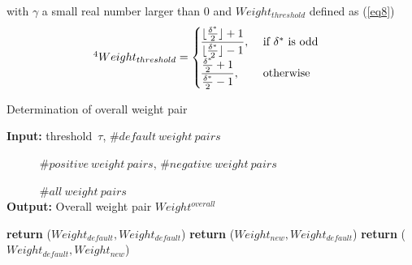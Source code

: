 with $\gamma$ a small real number larger than 0 and $Weight_{threshold}$ defined as (\ref{eq8})
\begin{equation}\label{eq8}\footnotemark[4]
    Weight_{threshold}=\left\{\begin{array}{ll}
        \hspace{-6pt}\dfrac{\lfloor \frac{\delta^{*}}{2}\rfloor +1}{\lfloor \frac{\delta^{*}}{2}\rfloor -1}, & \text { if } \delta^{*} \text { is odd } \\
    \hspace{-6pt}\dfrac{\frac{\delta^{*}}{2}+1}{\frac{\delta^{*}}{2}-1}, & \text { otherwise }
    \end{array}\right.
\end{equation}
\begin{algorithm}[h]
    \caption{Determination of overall weight pair}
    \label{algo3}
    \hspace*{0.02in} {\bf Input:} threshold\ $\tau$, $\#default\ weight\ pairs$\footnotemark[5]

    $\hspace{35pt} \#positive\ weight\ pairs$\footnotemark[6], $\#negative\ weight\ pairs$\footnotemark[7]

    $\hspace{35pt}\#all\ weight\ pairs$\footnotemark[8] \\
    \hspace*{0.02in} {\bf Output:} Overall weight pair $Weight^{overall}$
    \begin{algorithmic}[1]
            \State \textbf{return} ($Weight_{default},Weight_{default}$)
            \Else
                \State \textbf{return} ($Weight_{new},Weight_{default}$)
                \Else
                \State \textbf{return} ($Weight_{default},Weight_{new}$)
            \EndIf
        \EndIf
    \end{algorithmic}
\end{algorithm}

